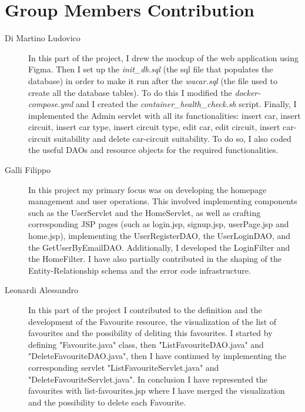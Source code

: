\section{Group Members Contribution}


\begin{description}
	\item[Di Martino Ludovico] In this part of the project, I drew the mockup of the web application using Figma. Then I set up the \textit{init\_db.sql} (the sql file that populates the database) in order to make it run after the \textit{wacar.sql} (the file used to create all the database tables). To do this I modified the \textit{docker-compose.yml} and I created the \textit{container\_health\_check.sh} script. Finally, I implemented the Admin servlet with all its functionalities: insert car, insert circuit, insert car type, insert circuit type, edit car, edit circuit, insert car-circuit suitability and delete car-circuit suitability. To do so, I also coded the useful DAOs and resource objects for the required functionalities.
	\item[Galli Filippo] In this project my primary focus was on developing the homepage management and user operations. This involved implementing components such as the UserServlet and the HomeServlet, as well as crafting corresponding JSP pages (such as login.jsp, signup.jsp, userPage.jsp and home.jsp), implementing the UserRegisterDAO, the UserLoginDAO, and the GetUserByEmailDAO. Additionally, I developed the LoginFilter and the HomeFilter. I have also partially contributed in the shaping of the Entity-Relationship schema and the error code infrastructure.
	\item[Leonardi Alessandro] In this part of the project I contributed to the definition and the development of the Favourite resource, the visualization of the list of favourites and the possibility of deliting this favourites. I started by defining "Favourite.java" class, then "ListFavouriteDAO.java" and "DeleteFavouriteDAO.java", then I have continued by implementing the corresponding servlet "ListFavouriteServlet.java" and "DeleteFavouriteServlet.java". In conclusion I have represented the favourites with list-favourites.jsp where I have merged the visualization and the possibility to delete each Favourite. 

\end{description}

